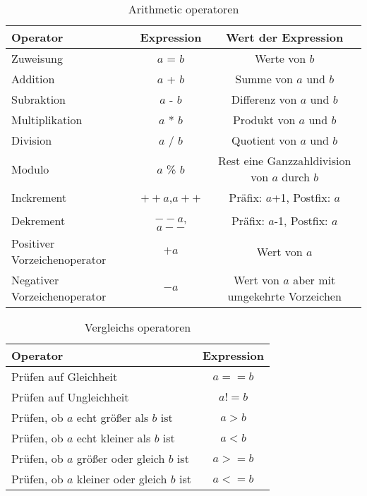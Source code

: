 \begin{table}
\caption{Arithmetic operatoren \label{oper}}
\centering
\begin{tabular}{|l c c|}
\hline
Operator & Expression & Wert der Expression \\
\hline
Zuweisung & $a$ = $b$ & Werte von $b$ \\
Addition & $a$ + $b$ & Summe von $a$ und $b$ \\
Subraktion & $a$ - $b$ & Differenz von $a$ und $b$ \\
Multiplikation & $a$ * $b$ & Produkt von $a$ und $b$ \\
Division & $a$ / $b$ & Quotient von $a$ und $b$ \\
Modulo & $a$ \% $b$ & Rest eine Ganzzahldivision von $a$ durch $b$ \\
Inckrement & $++a$,$a++$ & Präfix: $a$+1, Postfix: $a$ \\
Dekrement & $--a$, $a--$ & Präfix: $a$-1, Postfix: $a$ \\
Positiver Vorzeichenoperator & $+a$ & Wert von $a$ \\
Negativer Vorzeichenoperator & $-a$ & Wert von $a$ aber mit umgekehrte Vorzeichen \\
\hline
\end{tabular}
\end{table}

\begin{table}
\caption{Vergleichs operatoren \label{vergoper}}
\centering
\begin{tabular}{|l c|}
\hline
Operator & Expression \\
\hline
Prüfen auf Gleichheit & $a == b$  \\
Prüfen auf Ungleichheit & $a != b$ \\
Prüfen, ob $a$ echt größer als $b$ ist & $a>b$ \\
Prüfen, ob $a$ echt kleiner als $b$ ist & $a<b$ \\
Prüfen, ob $a$ größer oder gleich $b$ ist & $a>=b$ \\
Prüfen, ob $a$ kleiner oder gleich $b$ ist & $a<=b$ \\
\hline
\end{tabular}
\end{table}

